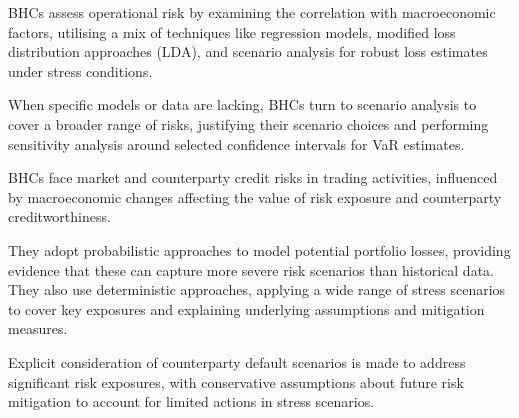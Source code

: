 \begin{lettered}
\item BHCs assess operational risk by examining the correlation with macroeconomic
factors, utilising a mix of techniques like regression models, modified loss
distribution approaches (LDA), and scenario analysis for robust loss estimates
under stress conditions.
\item When specific models or data are lacking, BHCs turn to scenario analysis to
cover a broader range of risks, justifying their scenario choices and performing
sensitivity analysis around selected confidence intervals for VaR estimates.
\end{lettered}

\begin{lettered}
\item BHCs face market and counterparty credit risks in trading activities,
influenced by macroeconomic changes affecting the value of risk exposure and
counterparty creditworthiness.
\item They adopt probabilistic approaches to model potential portfolio losses,
providing evidence that these can capture more severe risk scenarios than
historical data. They also use deterministic approaches, applying a wide range of
stress scenarios to cover key exposures and explaining underlying assumptions and
mitigation measures.
\item Explicit consideration of counterparty default scenarios is made to address
significant risk exposures, with conservative assumptions about future risk
mitigation to account for limited actions in stress scenarios.
\end{lettered}

